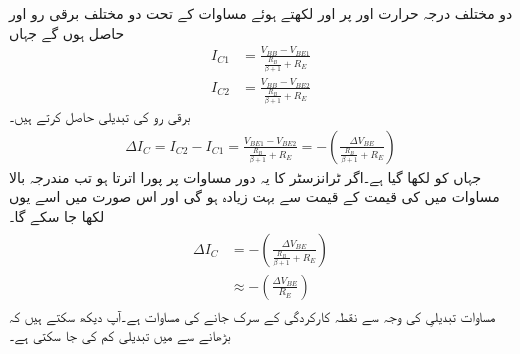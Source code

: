 دو مختلف درجہ حرارت   اور  پر   اور  لکھتے ہوئے مساوات   کے تحت دو مختلف برقی رو   اور  حاصل ہوں گے جہاں
\begin{align}
I_{C1}&=\frac{V_{BB}-V_{BE1}}{\frac{R_B }{\beta+1}+R_E}\\
I_{C2}&=\frac{V_{BB}-V_{BE2}}{\frac{R_B }{\beta+1}+R_E}
\end{align}
برقی رو کی تبدیلی حاصل کرتے ہیں۔
\begin{align}
\Delta I_C = I_{C2}-I_{C1}=\frac{V_{BE1}-V_{BE2}}{\frac{R_B}{\beta+1}+R_E}=- \left (\frac{\Delta V_{BE}}{\frac{R_B}{\beta+1}+R_E} \right )
\end{align}
جہاں  کو  لکھا گیا ہے۔اگر ٹرانزسٹر کا یہ دور 
مساوات   پر پورا اترتا ہو تب مندرجہ بالا مساوات میں   کی قیمت  کے قیمت سے بہت زیادہ ہو گی اور اس صورت میں اسے  یوں لکھا جا سکے گا۔
\begin{gather}
\begin{aligned} \label{مساوات_ٹرانزسٹر_قابو_مخارج_دباو_سے_سرک}
\Delta I_C &= -\left ( \frac{\Delta V_{BE}}{\frac{R_B}{\beta+1}+R_E} \right )\\
& \approx -\left (\frac{\Delta V_{BE}}{R_E} \right )
\end{aligned}
\end{gather}
مساوات   تبدیلیِ   کی وجہ سے نقطہ کارکردگی کے سرک جانے کی مساوات ہے۔آپ دیکھ سکتے ہیں کہ  بڑھانے سے  میں تبدیلی کم کی جا سکتی ہے۔



